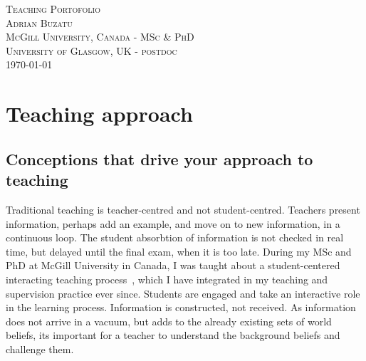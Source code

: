 \documentclass[12pt]{article} %
\begin{document}
{
\center%
\textsc{\LARGE Teaching Portofolio}\\[0.5cm] %
\textsc{\LARGE Adrian Buzatu}\\[1.0cm] %
\textsc{\large McGill University, Canada - MSc \& PhD}\\[0.5cm] %
\textsc{\large University of Glasgow, UK - postdoc}\\[1.0cm] %
{\large \today}\\[0.5cm] %

}




\tableofcontents %



\section{Teaching approach} %


\subsection{Conceptions that drive your approach to teaching}

Traditional teaching is teacher-centred and not student-centred. Teachers present information, perhaps add an example, and move on to new information, in a continuous loop. The student absorbtion of information is not checked in real time, but delayed until the final exam, when it is too late. During my MSc and PhD at McGill University in Canada, I was taught about a student-centered interacting teaching process~\cite{T-PULSE}, which I have integrated in my teaching and supervision practice ever since. Students are engaged and take an interactive role in the learning process. Information is constructed, not received. As information does not arrive in a vacuum, but adds to the already existing sets of world beliefs, its important for a teacher to understand the background beliefs and challenge them. 
\end{document}
